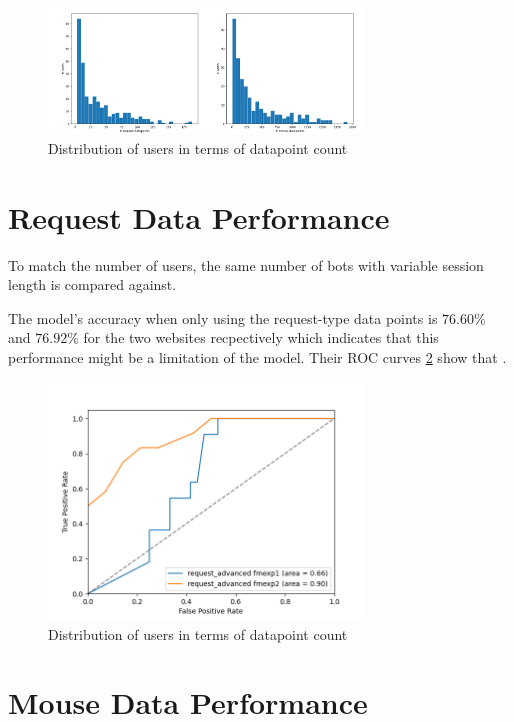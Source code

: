 \documentclass[
    fontsize=12pt,
    headings=small,
    parskip=half,           %
    bibliography=totoc,
    numbers=noenddot,       %
    open=any,               %
    final                   %
]{scrreprt}
\begin{document}
\begin{figure}[h]
	\includegraphics[width=0.75\textwidth]{figures/user_dp_hist.png}
	\caption{Distribution of users in terms of datapoint count}
	\label{fig:user_dp_hist}
\end{figure}



\section{Request Data Performance}

To match the number of users, the same number of bots with variable session length is compared against.

The model's accuracy when only using the request-type data points is $76.60\%$ and $76.92\%$ for the two websites recpectively which indicates that this performance might be a limitation of the model. Their ROC curves \ref{fig:roc_request_both_instances} show that .

\begin{figure}[h]
	\includegraphics[width=0.75\textwidth]{figures/roc_request_both_instances.png}
	\caption{Distribution of users in terms of datapoint count}
	\label{fig:roc_request_both_instances}
\end{figure}


\section{Mouse Data Performance}
\end{document}

